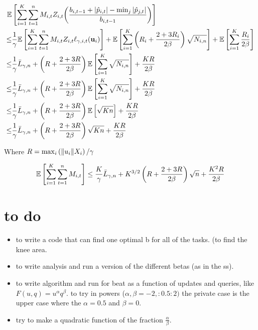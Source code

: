 \begin{equation*}
\begin{split}
\mathbb{E}&\left[{\sum_{i=1}^{K}\sum_{t=1}^{n}M_{i,t}Z_{i,t}{\left({\frac{b_{i,t-1} +\left\vert{\hat{p}_{i,t}}\right\vert-\min_j\left\vert{\hat{p}_{j,t}}\right\vert}{b_{i,t-1}}}\right)}}\right]\\
\le &\frac{1}{\gamma}\mathbb{E}\left[{\sum_{i=1}^{K}\sum_{t=1}^{n}{M_{i,t}Z_{i,t}}\ell_{\gamma,i,t}(\mathbf{u}_i)}\right]
+\mathbb{E}\left[{\sum_{i=1}^{K}\left({R_{i}+\frac{2+3R_{i}}{2\beta}}\right)\sqrt{N_{i,n}}}\right]
+\mathbb{E}\left[{\sum_{i=1}^{K}\frac{R_i}{2\beta}}\right]\\
\le & \frac{1}{\gamma}{\bar L}_{\gamma,n}+\left({R+\frac{2+3R}{2\beta}}\right)\mathbb{E}\left[{\sum_{i=1}^{K}\sqrt{N_{i,n}}}\right]
+\frac{KR}{2\beta}\\
\le & \frac{1}{\gamma}{\bar L}_{\gamma,n}+\left({R+\frac{2+3R}{2\beta}}\right)\mathbb{E}\left[{\sum_{i=1}^{K}\sqrt{N_{i,n}}}\right]
+\frac{KR}{2\beta}\\
\le & \frac{1}{\gamma}{\bar L}_{\gamma,n}+\left({R+\frac{2+3R}{2\beta}}\right)\mathbb{E}\left[{\sqrt{Kn}}\right]
+\frac{KR}{2\beta}\\
\le & \frac{1}{\gamma}{\bar L}_{\gamma,n}+\left({R+\frac{2+3R}{2\beta}}\right)\sqrt{Kn}
+\frac{KR}{2\beta}
\end{split}
\end{equation*}

Where $R=\max_i\left({\Vert u_i\Vert X_i}\right)/{\gamma}$


\begin{equation*}
\mathbb{E}\left[ \sum_{i=1}^{K}\sum_{t=1}^{n}{M_{i,t}} \right]
\le  \frac{K}{\gamma}{\bar L}_{\gamma,n}+K^{3/2}\left({R+\frac{2+3R}{2\beta}}\right)\sqrt{n}
+\frac{K^{2}R}{2\beta}
\end{equation*}

\section{to do}
\begin{itemize}
\item 
to write a code that can find one optimal b for all of the tasks. (to find the knee area.
\item
to write analysis and run a version of the different betas (as in the ss).
\item
to write algorithm and run for beat as a function of updates and queries, like $F(u,q) = u^\alpha q^\beta$. to try in powers ($\alpha,\beta =-2,:0.5:2)$ the private case is the upper case where the $\alpha=0.5$ and $\beta = 0$.
\item
 try to make a quadratic function of the fraction $\frac{\alpha}{\beta}$.
\end{itemize}




